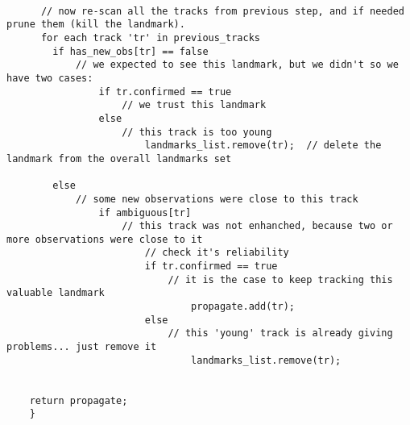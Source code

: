 {\begin{lstlisting}[frame=shadowbox,breaklines]
      
      // now re-scan all the tracks from previous step, and if needed prune them (kill the landmark).
      for each track 'tr' in previous_tracks
      	if has_new_obs[tr] == false
        	// we expected to see this landmark, but we didn't so we have two cases:
                if tr.confirmed == true
                	// we trust this landmark
                else
                	// this track is too young
                        landmarks_list.remove(tr);	// delete the landmark from the overall landmarks set
        
        else
        	// some new observations were close to this track
                if ambiguous[tr]
                	// this track was not enhanched, because two or more observations were close to it
                        // check it's reliability
                        if tr.confirmed == true
                        	// it is the case to keep tracking this valuable landmark
                                propagate.add(tr);
                        else
                        	// this 'young' track is already giving problems... just remove it
                                landmarks_list.remove(tr);
                
      
    return propagate;
    }
  \end{lstlisting}
}
